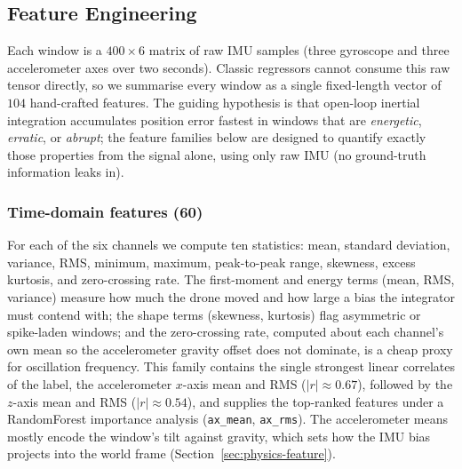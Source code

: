 %

\subsection{Feature Engineering}
\label{sec:feature-engineering}

Each window is a $400 \times 6$ matrix of raw IMU samples (three gyroscope
and three accelerometer axes over two seconds). Classic regressors cannot
consume this raw tensor directly, so we summarise every window as a single
fixed-length vector of $104$ hand-crafted features. The guiding hypothesis
is that open-loop inertial integration accumulates position error fastest in
windows that are \emph{energetic}, \emph{erratic}, or \emph{abrupt}; the
feature families below are designed to quantify exactly those properties from
the signal alone, using only raw IMU (no ground-truth information leaks in).

\subsubsection{Time-domain features (60)}
For each of the six channels we compute ten statistics: mean, standard
deviation, variance, RMS, minimum, maximum, peak-to-peak range, skewness,
excess kurtosis, and zero-crossing rate. The first-moment and energy terms
(mean, RMS, variance) measure how much the drone moved and how large a bias
the integrator must contend with; the shape terms (skewness, kurtosis) flag
asymmetric or spike-laden windows; and the zero-crossing rate, computed about
each channel's own mean so the accelerometer gravity offset does not dominate,
is a cheap proxy for oscillation frequency. This family contains the single
strongest linear correlates of the label, the accelerometer $x$-axis mean
and RMS ($|r| \approx 0.67$), followed by the $z$-axis mean and RMS
($|r| \approx 0.54$), and supplies the top-ranked features under a
RandomForest importance analysis (\texttt{ax\_mean}, \texttt{ax\_rms}).
The accelerometer means mostly encode
the window's tilt against gravity, which sets how the IMU bias projects into
the world frame (Section~\ref{sec:physics-feature}).

